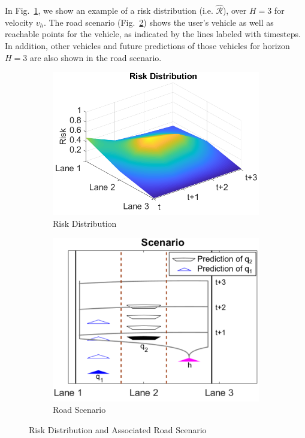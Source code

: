 \documentclass[letterpaper, 10 pt, conference]{ieeeconf}  %
\newcommand\NB[1]{$\spadesuit$\footnote{NB: #1}}
\begin{document}
 In Fig.~\ref{fig:distr}, we show an example of a risk distribution (i.e. $\hat{\mathcal{R}}$), over $H=3$ for velocity $v_h$. The road scenario (Fig.~\ref{fig:roads}) shows the user's vehicle as well as reachable points for the vehicle, as indicated by the lines labeled with timesteps. In addition, other vehicles and future predictions of those vehicles for horizon $H=3$ are also shown in the road scenario.

\begin{figure}[H]
\centering
\begin{subfigure}{.54\linewidth}
  \centering
  \includegraphics[width=\linewidth]{fig/assist_rd.png}
  \caption{Risk Distribution}
  \label{fig:distr}
\end{subfigure}%
\begin{subfigure}{.46\linewidth}
  \centering
  \includegraphics[width=\linewidth]{fig/riskdist_rs.png}
  \caption{Road Scenario}
  \label{fig:roads}
\end{subfigure}
\caption{Risk Distribution and Associated Road Scenario}
\label{fig:riskd}
\end{figure}
\end{document}
